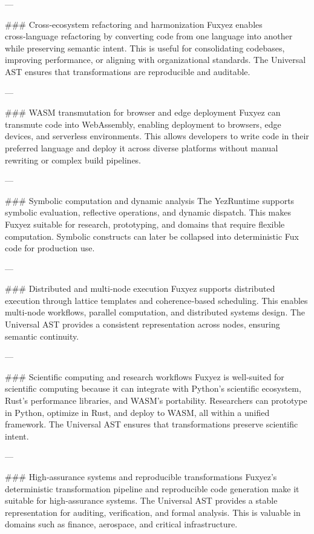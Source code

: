 \begin{enumerate}
---

\#\#\# Cross‑ecosystem refactoring and harmonization  
Fuxyez enables cross‑language refactoring by converting code from one language into another while preserving semantic intent. This is useful for consolidating codebases, improving performance, or aligning with organizational standards. The Universal AST ensures that transformations are reproducible and auditable.

---

\#\#\# WASM transmutation for browser and edge deployment  
Fuxyez can transmute code into WebAssembly, enabling deployment to browsers, edge devices, and serverless environments. This allows developers to write code in their preferred language and deploy it across diverse platforms without manual rewriting or complex build pipelines.

---

\#\#\# Symbolic computation and dynamic analysis  
The YezRuntime supports symbolic evaluation, reflective operations, and dynamic dispatch. This makes Fuxyez suitable for research, prototyping, and domains that require flexible computation. Symbolic constructs can later be collapsed into deterministic Fux code for production use.

---

\#\#\# Distributed and multi‑node execution  
Fuxyez supports distributed execution through lattice templates and coherence‑based scheduling. This enables multi‑node workflows, parallel computation, and distributed systems design. The Universal AST provides a consistent representation across nodes, ensuring semantic continuity.

---

\#\#\# Scientific computing and research workflows  
Fuxyez is well‑suited for scientific computing because it can integrate with Python’s scientific ecosystem, Rust’s performance libraries, and WASM’s portability. Researchers can prototype in Python, optimize in Rust, and deploy to WASM, all within a unified framework. The Universal AST ensures that transformations preserve scientific intent.

---

\#\#\# High‑assurance systems and reproducible transformations  
Fuxyez’s deterministic transformation pipeline and reproducible code generation make it suitable for high‑assurance systems. The Universal AST provides a stable representation for auditing, verification, and formal analysis. This is valuable in domains such as finance, aerospace, and critical infrastructure.


\end{enumerate}
